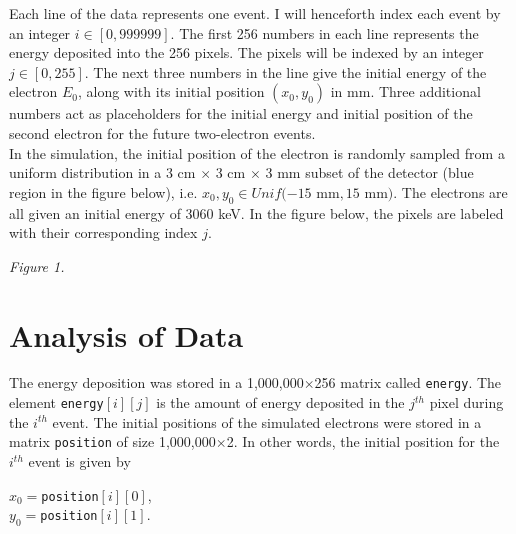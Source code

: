 \documentclass[12pt]{article}
\begin{document}
\noindent Each line of the data represents one event. I will henceforth index each event by an integer $i \in [0,999999]$. The first 256 numbers in each line represents the energy deposited into the 256 pixels. The pixels will be indexed by an integer $j \in [0,255]$. The next three numbers in the line give the initial energy of the electron $E_0$, along with its initial position $(x_0,y_0)$ in mm. Three additional numbers act as placeholders for the initial energy and initial position of the second electron for the future two-electron events.\\

\noindent In the simulation, the initial position of the electron is randomly sampled from a uniform distribution in a 3 cm $\times$ 3 cm $\times$ 3 mm subset of the detector (blue region in the figure below), i.e. $x_0,y_0 \in Unif(-15$ mm$,15$ mm$)$. The electrons are all given an initial energy of 3060 keV. In the figure below, the pixels are labeled with their corresponding index $j$.

\begin{center}

\textit{Figure 1.} 
\end{center} 


\section{Analysis of Data}

The energy deposition was stored in a 1,000,000$\times$256 matrix called \texttt{energy}. The element \texttt{energy$[i][j]$} is the amount of energy deposited in the $j^{th}$ pixel during the $i^{th}$ event. The initial positions of the simulated electrons were stored in a matrix \texttt{position} of size 1,000,000$\times$2. In other words, the initial position for the $i^{th}$ event is given by
\begin{center}
$x_0=$\texttt{position$[i][0]$},\\
$y_0=$\texttt{position$[i][1]$}.
\end{center}
\end{document}
